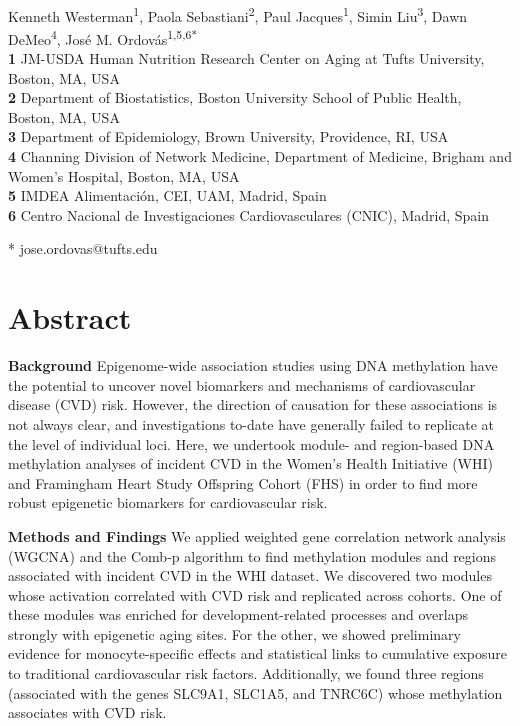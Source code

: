 \documentclass[]{article}
\title{}
\author{}
\date{}
\theoremstyle{definition}
\theoremstyle{definition}
\theoremstyle{definition}
\theoremstyle{remark}
\begin{document}
\begin{flushleft}
{\Large
\textbf{}
}
\newline
\\
Kenneth Westerman\textsuperscript{1},
Paola Sebastiani\textsuperscript{2},
Paul Jacques\textsuperscript{1},
Simin Liu\textsuperscript{3},
Dawn DeMeo\textsuperscript{4},
Jos\'e M. Ordov\'as\textsuperscript{1,5,6*}
\\
\bigskip
\textbf{1} JM-USDA Human Nutrition Research Center on Aging at Tufts University, Boston, MA, USA
\\
\textbf{2} Department of Biostatistics, Boston University School of Public Health, Boston, MA, USA
\\
\textbf{3} Department of Epidemiology, Brown University, Providence, RI, USA
\\
\textbf{4} Channing Division of Network Medicine, Department of Medicine, Brigham and Women's Hospital, Boston, MA, USA
\\
\textbf{5} IMDEA Alimentaci\'on, CEI, UAM, Madrid, Spain
\\
\textbf{6} Centro Nacional de Investigaciones Cardiovasculares (CNIC), Madrid, Spain
\\
\bigskip

* jose.ordovas@tufts.edu

\end{flushleft}

\section{Abstract}\label{abstract}

\textbf{Background} Epigenome-wide association studies using DNA
methylation have the potential to uncover novel biomarkers and
mechanisms of cardiovascular disease (CVD) risk. However, the direction
of causation for these associations is not always clear, and
investigations to-date have generally failed to replicate at the level
of individual loci. Here, we undertook module- and region-based DNA
methylation analyses of incident CVD in the Women's Health Initiative
(WHI) and Framingham Heart Study Offspring Cohort (FHS) in order to find
more robust epigenetic biomarkers for cardiovascular risk.

\textbf{Methods and Findings} We applied weighted gene correlation
network analysis (WGCNA) and the Comb-p algorithm to find methylation
modules and regions associated with incident CVD in the WHI dataset. We
discovered two modules whose activation correlated with CVD risk and
replicated across cohorts. One of these modules was enriched for
development-related processes and overlaps strongly with epigenetic
aging sites. For the other, we showed preliminary evidence for
monocyte-specific effects and statistical links to cumulative exposure
to traditional cardiovascular risk factors. Additionally, we found three
regions (associated with the genes SLC9A1, SLC1A5, and TNRC6C) whose
methylation associates with CVD risk.
\end{document}
